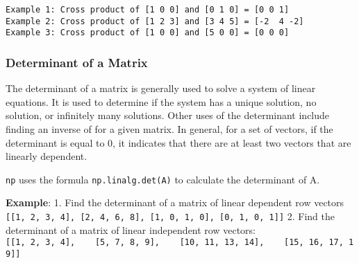 \documentclass[11pt]{article}
\begin{document}
    \begin{Verbatim}[commandchars=\\\{\}]
Example 1: Cross product of [1 0 0] and [0 1 0] = [0 0 1]
Example 2: Cross product of [1 2 3] and [3 4 5] = [-2  4 -2]
Example 3: Cross product of [1 0 0] and [5 0 0] = [0 0 0]
    \end{Verbatim}

    \newpage

\subsubsection{Determinant of a Matrix}\label{determinant-of-a-matrix}

The determinant of a matrix is generally used to solve a system of
linear equations. It is used to determine if the system has a unique
solution, no solution, or infinitely many solutions. Other uses of the
determinant include finding an inverse of for a given matrix. In
general, for a set of vectors, if the determinant is equal to 0, it
indicates that there are at least two vectors that are linearly
dependent.

\texttt{np} uses the formula \texttt{np.linalg.det(A)} to calculate the
determinant of A.

\textbf{Example}: 1. Find the determinant of a matrix of linear
dependent row vectors
\texttt{{[}{[}1,\ 2,\ 3,\ 4{]},\ {[}2,\ 4,\ 6,\ 8{]},\ {[}1,\ 0,\ 1,\ 0{]},\ {[}0,\ 1,\ 0,\ 1{]}{]}}
2. Find the determinant of a matrix of linear independent row vectors:
\texttt{{[}{[}1,\ 2,\ 3,\ 4{]},\ \ \ \ {[}5,\ 7,\ 8,\ 9{]},\ \ \ \ {[}10,\ 11,\ 13,\ 14{]},\ \ \ \ {[}15,\ 16,\ 17,\ 19{]}{]}}
\end{document}
